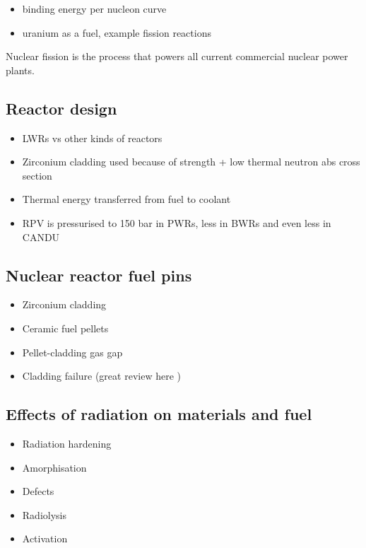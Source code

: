 \begin{itemize}
\item binding energy per nucleon curve
\item uranium as a fuel, example fission reactions
\end{itemize}

Nuclear fission is the process that powers all current commercial nuclear power plants. 
\subsection{Reactor design}

\begin{itemize}
\item LWRs vs other kinds of reactors
\item Zirconium cladding used because of strength + low thermal neutron abs cross section
\item Thermal energy transferred from fuel to coolant
\item RPV is pressurised to 150 bar in PWRs, less in BWRs and even less in CANDU
\end{itemize}

\subsection{Nuclear reactor fuel pins}

\begin{itemize}
\item Zirconium cladding
\item Ceramic fuel pellets
\item Pellet-cladding gas gap
\item Cladding failure (great review here \cite{alam2011review})
\end{itemize}

\subsection{Effects of radiation on materials and fuel}

\begin{itemize}
\item Radiation hardening
\item Amorphisation
\item Defects
\item Radiolysis
\item Activation
\end{itemize}

